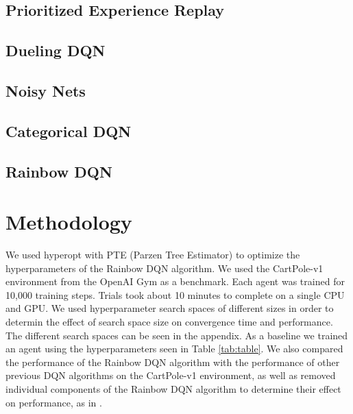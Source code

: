 \documentclass{article}
\begin{document}
\subsection{Prioritized Experience Replay}
\lipsum[7]

\subsection{Dueling DQN}
\lipsum[8]

\subsection{Noisy Nets}
\lipsum[9]

\subsection{Categorical DQN}
\lipsum[10]

\subsection{Rainbow DQN}
\lipsum[11]

\section{Methodology}
We used hyperopt with PTE (Parzen Tree Estimator) to optimize the hyperparameters of the Rainbow DQN algorithm. We used the CartPole-v1 environment from the OpenAI Gym as a benchmark. Each agent was trained for 10,000 training steps. Trials took about 10 minutes to complete on a single CPU and GPU. We used hyperparameter search spaces of different sizes in order to determin the effect of search space size on convergence time and performance. The different search spaces can be seen in the appendix. As a baseline we trained an agent using the hyperparameters seen in Table \ref{tab:table}. We also compared the performance of the Rainbow DQN algorithm with the performance of other previous DQN algorithms on the CartPole-v1 environment, as well as removed individual components of the Rainbow DQN algorithm to determine their effect on performance, as in \citep{DBLP:journals/corr/abs-1710-02298}.
\end{document}
